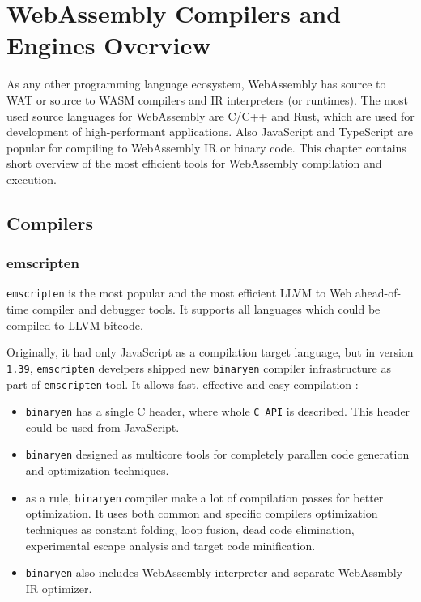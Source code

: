 \chapter{WebAssembly Compilers and Engines Overview}

As any other programming language ecosystem, WebAssembly has source to WAT or source to WASM compilers and IR interpreters (or runtimes).
The most used source languages for WebAssembly are C/C++ and Rust, which are used for development of high-performant applications.
Also JavaScript and TypeScript are popular for compiling to WebAssembly IR or binary code.
This chapter contains short overview of the most efficient tools for WebAssembly compilation and execution.

\section{Compilers}

\subsection{emscripten}  \mbox{}

\indent \texttt{emscripten} is the most popular and the most efficient LLVM to Web ahead-of-time compiler and debugger tools.
It supports all languages which could be compiled to LLVM bitcode.

Originally, it had only JavaScript as a compilation target language, but in version \texttt{1.39},
\texttt{emscripten} develpers shipped new \texttt{binaryen} compiler infrastructure as part of \texttt{emscripten} tool.
It allows fast, effective and easy compilation :
\begin{itemize}
 \item \texttt{binaryen} has a single C header, where whole \texttt{C API} is described. This header could be used from JavaScript.
 \item \texttt{binaryen} designed as multicore tools for completely parallen code generation and optimization techniques.
 \item as a rule, \texttt{binaryen} compiler make a lot of compilation passes for better optimization.
   It uses both common and specific compilers optimization techniques as constant folding, loop fusion,
   dead code elimination, experimental escape analysis and target code minification.
 \item \texttt{binaryen} also includes WebAssembly interpreter and separate WebAssmbly IR optimizer. 
\end{itemize}

